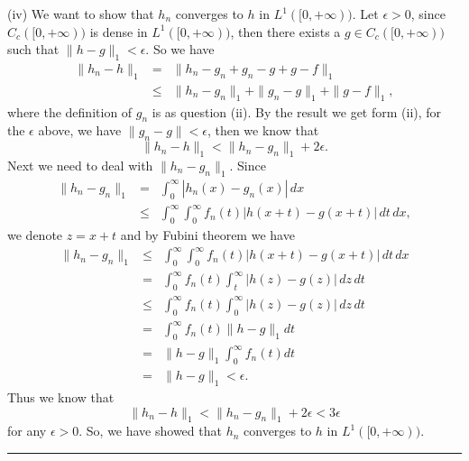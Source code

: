 \documentclass[12pt,a4paper]{ctexart}
\begin{document}
(iv) We want to show that $h_{n}$ converges to $h$ in $L^{1}([0, + \infty))$. Let $\epsilon > 0$, since $C_{c}([0, + \infty))$ is dense in $L^{1}([0, + \infty))$, then there exists a $g \in C_{c} ([0, + \infty))$ such that $\|h - g\|_{1} < \epsilon$. So we have
\begin{eqnarray*}
\|h_{n} - h \|_{1}  & = & \| h_{n} - g_{n} + g_{n} - g + g - f \|_{1} \\
& \leq & \|h_{n} - g_{n}\|_{1} + \|g_{n} - g\|_{1} + \| g - f \|_{1},
\end{eqnarray*}
where the definition of $g_{n}$ is as question (ii). By the result we get form (ii), for the $\epsilon$ above, we have $\|g_{n} - g\| < \epsilon$, then we know that
\begin{equation*}
    \|h_{n} - h \|_{1} < \|h_{n} - g_{n}\|_{1} + 2 \epsilon.
\end{equation*}
Next we need to deal with $\|h_{n} - g_{n}\|_{1}$. Since
\begin{eqnarray*}
\|h_{n} - g_{n}\|_{1} & = & \int_{0}^{\infty} |h_{n} (x)- g_{n} (x)| \, d x \\
& \leq & \int_{0}^{\infty} \int_{0}^{\infty} f_{n} (t) |h(x + t) - g(x + t)| \, d t \, d x,
\end{eqnarray*}
we denote $z = x + t$ and by Fubini theorem we have
\begin{eqnarray*}
\|h_{n} - g_{n}\|_{1}  & \leq & \int_{0}^{\infty} \int_{0}^{\infty} f_{n} (t) |h(x + t) - g(x + t)| \, d t \, d x \\
& = & \int_{0}^{\infty}  f_{n} (t) \int_{t}^{\infty} |h(z) - g(z)| \, d z \, d t \\
& \leq & \int_{0}^{\infty}  f_{n} (t) \int_{0}^{\infty} |h(z) - g(z)| \, d z \, d t \\
& = & \int_{0}^{\infty}  f_{n} (t) \|h - g\|_{1} d t \\
& = & \|h - g\|_{1} \int_{0}^{\infty} f_{n} (t) d t \\
& = & \|h - g\|_{1} < \epsilon.
\end{eqnarray*}
Thus we know that 
\begin{equation*}
    \|h_{n} - h\|_{1} < \|h_{n} - g_{n}\|_{1} + 2 \epsilon < 3 \epsilon
\end{equation*}
for any $\epsilon > 0$. So, we have showed that $h_{n}$ converges to $h$ in $L^{1}([0, + \infty))$.

\noindent\rule[0.25\baselineskip]{\textwidth}{0.5pt}

\vspace{8pt}
\end{document}
